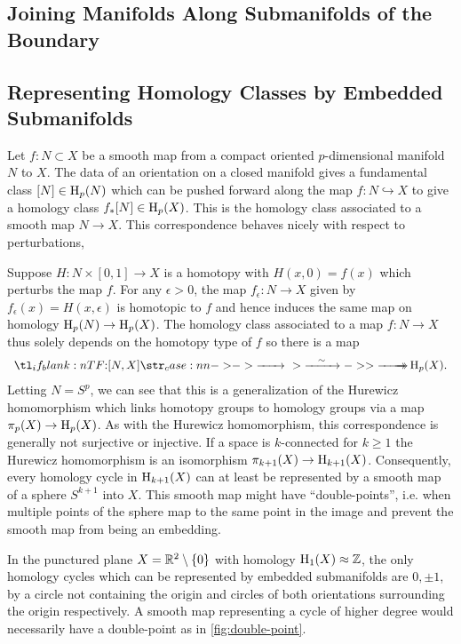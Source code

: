 \subsection{Joining Manifolds Along Submanifolds of the Boundary}

\subsection{Representing Homology Classes by Embedded Submanifolds}

Let $f : N\subset X$ be a smooth map from a compact oriented $p$-dimensional manifold $N$ to $X$. The data of an orientation on a closed manifold gives a fundamental class $[N]\in \operatorname{H}_p(N)$ which can be pushed forward along the map $f : N \hookrightarrow X$ to give a homology class $f_* [N]\in \operatorname{H}_p(X)$. This is the homology class associated to a smooth map $N\to X$.
This correspondence behaves nicely with respect to perturbations, 

Suppose $H : N\times [0,1] \to X$ is a homotopy with $H(x,0)=f(x)$ which perturbs the map $f$. For any $\epsilon>0$, the map $f_\epsilon : N \to X$ given by $f_\epsilon(x)=H(x,\epsilon)$ is homotopic to $f$ and hence induces the same map on homology $\operatorname{H}_p(N)\to \operatorname{H}_p(X)$. The homology class associated to a map $f : N \to X$ thus solely depends on the homotopy type of $f$ so there is a map
\[
	\lkxfunc{}{[N,X]}{\H_p(X).}
\]
Letting $N=S^p$, we can see that this is a generalization of the Hurewicz homomorphism which links homotopy groups to homology groups via a map $\pi_p(X) \to \operatorname{H}_p(X)$.
As with the Hurewicz homomorphism, this correspondence is generally not surjective or injective. If a space is $k$-connected for $k\geq 1$ the Hurewicz homomorphism is an isomorphism $\pi_{k+1}(X) \to \operatorname{H}_{k+1}(X)$. Consequently, every homology cycle in $\operatorname{H}_{k+1}(X)$ can at least be represented by a smooth map of a sphere $S^{k+1}$ into $X$. This smooth map might have ``double-points'', i.e. when multiple points of the sphere map to the same point in the image and prevent the smooth map from being an embedding.

\begin{example}
	In the punctured plane $X=\mathbb{R}^2\setminus \{0\}$ with homology $\operatorname{H}_1(X)\approx \mathbb{Z}$, the only homology cycles which can be represented by embedded submanifolds are $0,\pm 1$, by a circle not containing the origin and circles of both orientations surrounding the origin respectively. A smooth map representing a cycle of higher degree would necessarily have a double-point as in \cref{fig:double-point}.
\end{example}

